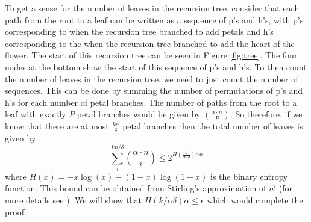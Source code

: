 To get a sense for the number of leaves in the recursion tree, consider that
each path from the root to a leaf can be written as a sequence of p's and h's,
with p's corresponding to when the recursion tree branched to add petals and h's
corresponding to the when the recursion tree branched to add the heart of the flower.
The start of this recursion tree can be seen in Figure \ref{fig:tree}. The four
nodes at the bottom show the start of this sequence of p's and h's.
To then count the number of leaves in the recursion tree, we need to just count
the number of sequences. This can be done by summing the number of permutations
of p's and h's for each number of petal branches. The number of
paths from the root to a leaf with exactly $P$ petal branches would be given
by $\binom{\alpha \cdot n}{P}$. So therefore, if we know that there are
at most $\frac{kn}{\delta}$ petal branches then the total number of leaves is given by
\begin{equation} \label{eq:num_leaves_idea}
    \sum_{i}^{kn / \delta} \binom{\alpha \cdot n}{i} \leq 2^{H(\frac{k}{\alpha \cdot \delta}) \alpha n}
\end{equation}
where $H(x) = -x \log(x) - (1-x)\log(1-x)$ is the binary entropy function. This bound
can be obtained from Stirling's approximation of $n!$ (for more details see \cite{flum2006parameterized}).
We will show that $H(k / \alpha \delta) \alpha \leq \epsilon$ which would complete the proof.

